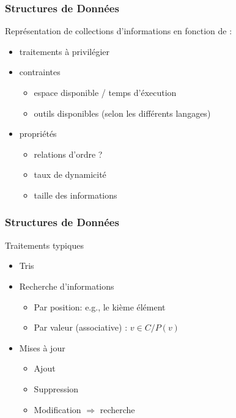 \documentclass[table,handout,tikz,12pt,svgnames]{beamer}
\subtitle{\Huge Listes}
\date{CM2}
\begin{document}
\begin{frame}
	\titlepage
\end{frame}

\begin{frame}[fragile=singleslide]
	\frametitle{Structures de Données}
		\begin{block}{Représentation de collections d'informations en fonction de :}
			\begin{itemize}
			\item traitements à privilégier
			\item contraintes
			\begin{itemize}
				\item espace disponible / temps d'éxecution
				\item outils disponibles (selon les différents langages)
			\end{itemize}
			\item propriétés
			\begin{itemize}
				\item relations d'ordre ?
				\item taux de dynamicité
				\item taille des informations
			\end{itemize}
		\end{itemize}
		\end{block}
\end{frame}

\begin{frame}[fragile=singleslide]
	\frametitle{Structures de Données}
	\begin{block}{Traitements typiques}
		\begin{itemize}
			\item Tris
			\item Recherche d'informations
			\begin{itemize}
				\item Par position: e.g., le kième élément
				\item Par valeur (associative) : $v \in C / P(v)$
			\end{itemize}
			\item Mises à jour
			\begin{itemize}
				\item Ajout
				\item Suppression
				\item Modification $\Rightarrow$ recherche
			\end{itemize}
		\end{itemize}
	\end{block}
\end{frame}
\end{document}
